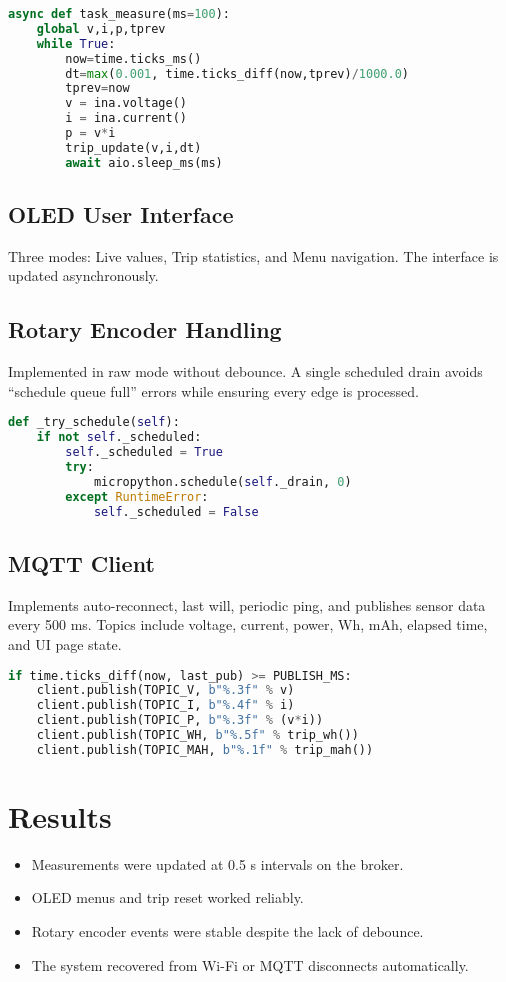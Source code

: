 \documentclass[a4paper,12pt]{article}
\begin{document}
\begin{lstlisting}[language=Python, caption=Measurement task]
async def task_measure(ms=100):
    global v,i,p,tprev
    while True:
        now=time.ticks_ms()
        dt=max(0.001, time.ticks_diff(now,tprev)/1000.0)
        tprev=now
        v = ina.voltage()
        i = ina.current()
        p = v*i
        trip_update(v,i,dt)
        await aio.sleep_ms(ms)
\end{lstlisting}

\subsection{OLED User Interface}
Three modes: Live values, Trip statistics, and Menu navigation. The interface is updated asynchronously.

\subsection{Rotary Encoder Handling}
Implemented in raw mode without debounce. A single scheduled drain avoids 
``schedule queue full'' errors while ensuring every edge is processed.

\begin{lstlisting}[language=Python, caption=RotaryRaw ISR scheduling]
def _try_schedule(self):
    if not self._scheduled:
        self._scheduled = True
        try:
            micropython.schedule(self._drain, 0)
        except RuntimeError:
            self._scheduled = False
\end{lstlisting}

\subsection{MQTT Client}
Implements auto-reconnect, last will, periodic ping, and publishes sensor data every 500 ms.  
Topics include voltage, current, power, Wh, mAh, elapsed time, and UI page state.

\begin{lstlisting}[language=Python, caption=MQTT publish logic]
if time.ticks_diff(now, last_pub) >= PUBLISH_MS:
    client.publish(TOPIC_V, b"%.3f" % v)
    client.publish(TOPIC_I, b"%.4f" % i)
    client.publish(TOPIC_P, b"%.3f" % (v*i))
    client.publish(TOPIC_WH, b"%.5f" % trip_wh())
    client.publish(TOPIC_MAH, b"%.1f" % trip_mah())
\end{lstlisting}

\section{Results}
\begin{itemize}
    \item Measurements were updated at 0.5 s intervals on the broker.
    \item OLED menus and trip reset worked reliably.
    \item Rotary encoder events were stable despite the lack of debounce.
    \item The system recovered from Wi-Fi or MQTT disconnects automatically.
\end{itemize}
\end{document}
